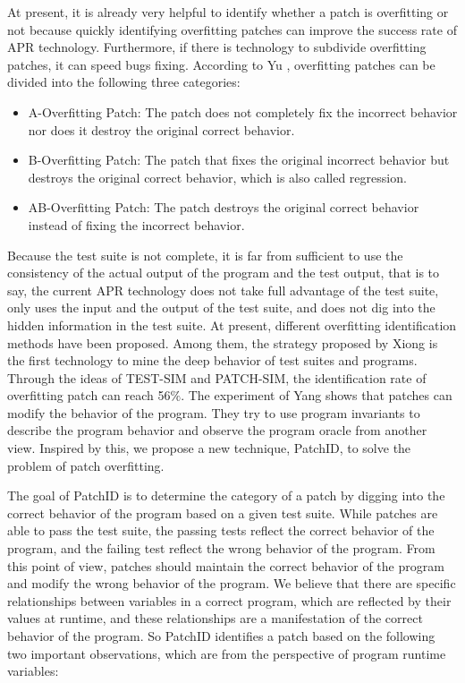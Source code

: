 \documentclass[sn-basic]{sn-jnl}
\theoremstyle{thmstyleone}
\theoremstyle{thmstyletwo}
\theoremstyle{thmstylethree}
\begin{document}
At present, it is already very helpful to identify whether a patch is overfitting or not because quickly identifying overfitting patches can improve the success rate  of APR technology. Furthermore, if there is technology to subdivide overfitting patches, it can speed bugs fixing. According to Yu \citeyearpar{bib4}, overfitting patches can be divided into the following three categories:

\begin{itemize}
	\item A-Overfitting Patch: The patch does not completely fix the incorrect behavior nor does it destroy the original correct behavior.
	\item B-Overfitting Patch: The patch that fixes the original incorrect behavior but destroys the original correct behavior, which is also called regression.
	\item AB-Overfitting Patch: The patch destroys the original correct behavior instead of fixing the incorrect behavior.
\end{itemize}

Because the test suite is not complete, it is far from sufficient to  use the consistency of the actual output of the program and the test output, that is to say, the current APR technology does not take full advantage of the test suite, only uses the input and the output of the test suite, and does not dig into the hidden information in the test suite. At present, different overfitting identification methods have been proposed. Among them, the strategy proposed by Xiong\citeyearpar{bib8} is the first technology to mine the deep behavior of test suites and programs. Through the ideas of TEST-SIM and PATCH-SIM, the identification rate of overfitting patch can reach 56$\%$. The experiment of Yang\citeyearpar{bib6} shows that patches can modify the behavior of the program. They try to use program invariants to describe the program behavior and observe the program oracle from another view. Inspired by this, we propose a new technique, PatchID, to solve the problem of patch overfitting.

The goal of PatchID is to determine the category of a patch by digging into the correct behavior of the program based on a given test suite. While patches are able to pass the test suite, the passing tests reflect the correct behavior of the program, and the failing test reflect the wrong behavior of the program. From this point of view, patches should maintain the correct behavior of the program and modify the wrong behavior of the program. We believe that there are specific relationships between variables in a correct program, which are reflected by their values at runtime, and these relationships are a manifestation of the correct behavior of the program. So PatchID identifies a patch based on the following two important observations, which are from the perspective of program runtime variables:
\end{document}
